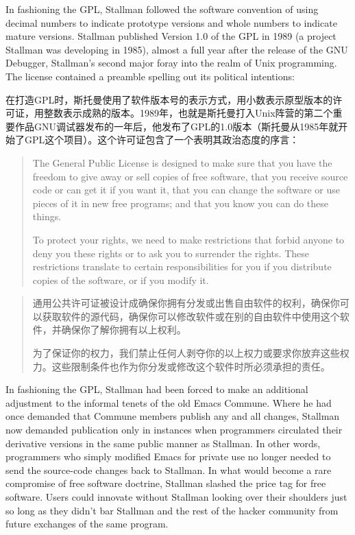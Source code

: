 \ifdefined\eng
In fashioning the GPL, Stallman followed the software convention of using decimal numbers to indicate prototype versions and whole numbers to indicate mature versions. Stallman published Version 1.0 of the GPL in 1989 (a project Stallman was developing in 1985), almost a full year after the release of the GNU Debugger, Stallman's second major foray into the realm of Unix programming. The license contained a preamble spelling out its political intentions:
\fi

\ifdefined\chs
在打造GPL时，斯托曼使用了软件版本号的表示方式，用小数表示原型版本的许可证，用整数表示成熟的版本。1989年，也就是斯托曼打入Unix阵营的第二个重要作品GNU调试器发布的一年后，他发布了GPL的1.0版本（斯托曼从1985年就开始了GPL这个项目）。这个许可证包含了一个表明其政治态度的序言：
\fi

\ifdefined\eng
\begin{quote}
The General Public License is designed to make sure that you have the freedom to give away or sell copies of free software, that you receive source code or can get it if you want it, that you can change the software or use pieces of it in new free programs; and that you know you can do these things.

To protect your rights, we need to make restrictions that forbid anyone to deny you these rights or to ask you to surrender the rights. These restrictions translate to certain responsibilities for you if you distribute copies of the software, or if you modify it.
\end{quote}
\fi

\ifdefined\chs
\begin{quote}
通用公共许可证被设计成确保你拥有分发或出售自由软件的权利，确保你可以获取软件的源代码，确保你可以修改软件或在别的自由软件中使用这个软件，并确保你了解你拥有以上权利。

为了保证你的权力，我们禁止任何人剥夺你的以上权力或要求你放弃这些权力。这些限制条件也作为你分发或修改这个软件时所必须承担的责任。
\end{quote}
\fi

\ifdefined\eng
In fashioning the GPL, Stallman had been forced to make an additional adjustment to the informal tenets of the old Emacs Commune. Where he had once demanded that Commune members publish any and all changes, Stallman now demanded publication only in instances when programmers circulated their derivative versions in the same public manner as Stallman. In other words, programmers who simply modified Emacs for private use no longer needed to send the source-code changes back to Stallman. In what would become a rare compromise of free software doctrine, Stallman slashed the price tag for free software. Users could innovate without Stallman looking over their shoulders just so long as they didn't bar Stallman and the rest of the hacker community from future exchanges of the same program.
\fi

